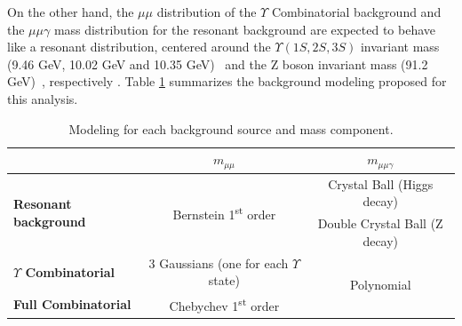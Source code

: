 On the other hand, the $\mu\mu$ distribution of the $\Upsilon$ Combinatorial background and the $\mu\mu\gamma$ mass distribution for the resonant background are expected to behave like a resonant distribution, centered around the $\Upsilon(1S, 2S, 3S)$ invariant mass (9.46 GeV, 10.02 GeV and 10.35 GeV)~\cite{pdg_2020} and the Z boson invariant mass (91.2 GeV)~\cite{pdg_2020}, respectively . Table \ref{tab:BckgModeling_Z} summarizes the background modeling proposed for this analysis.




\begin{table}[ht]
\begin{center}
\caption{Modeling for each background source and mass component.}
\begin{tabular}{l|c|c}
                         & $m_{\mu\mu}$                                          & $m_{\mu\mu\gamma}$       \\ \hline 
\multirow{2}{*}{\textbf{Resonant background} }      & \multirow{2}{*}{Bernstein 1\textsuperscript{st} order}                 & Crystal Ball (Higgs decay)    \\ 
                                  &                       & Double Crystal Ball (Z decay)    \\ \hline
\textbf{$\Upsilon$ Combinatorial} & 3 Gaussians (one for each $\Upsilon$ state) & \multirow{2}{*}{Polynomial}  \\ \cline{1-2}
\textbf{Full Combinatorial}       & Chebychev 1\textsuperscript{st} order                 &                          \\ 
\end{tabular}

\label{tab:BckgModeling_Z}
\end{center}
\end{table}


